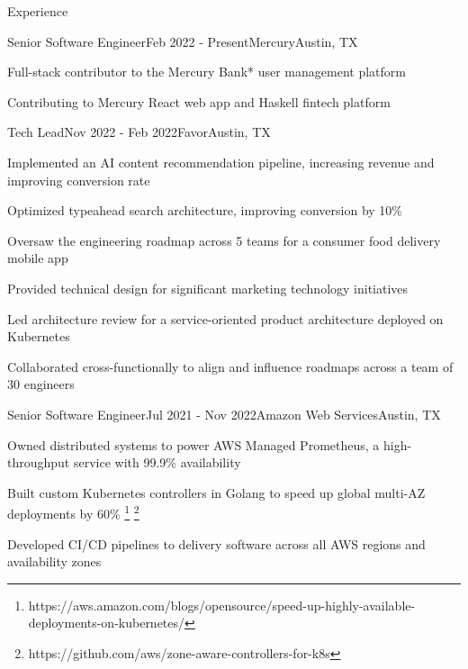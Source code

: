 \documentclass[
	10pt, %
]{resume} %
\begin{document}

\begin{rSection}{Experience}

    \begin{rSubsection}{Senior Software Engineer}{Feb 2022 - Present}{Mercury}{Austin, TX}
        \item Full-stack contributor to the Mercury Bank* user management platform
        \item Contributing to Mercury React web app and Haskell fintech platform
	\end{rSubsection}


	\begin{rSubsection}{Tech Lead}{Nov 2022 - Feb 2022}{Favor}{Austin, TX}
        \item Implemented an AI content recommendation pipeline, increasing revenue and improving conversion rate
        \item Optimized typeahead search architecture, improving conversion by 10\%
        \item Oversaw the engineering roadmap across 5 teams for a consumer food delivery mobile app
        \item Provided technical design for significant marketing technology initiatives
        \item Led architecture review for a service-oriented product architecture deployed on Kubernetes
        \item Collaborated cross-functionally to align and influence roadmaps across a team of 30 engineers
	\end{rSubsection}


    \begin{rSubsection}{Senior Software Engineer}{Jul 2021 - Nov 2022}{Amazon Web Services}{Austin, TX}
        \item Owned distributed systems to power AWS Managed Prometheus, a high-throughput service with 99.9\% availability
        \item Built custom Kubernetes controllers in Golang to speed up global multi-AZ deployments by 60\% \footnote{https://aws.amazon.com/blogs/opensource/speed-up-highly-available-deployments-on-kubernetes/} \footnote{https://github.com/aws/zone-aware-controllers-for-k8s}
        \item Developed CI/CD pipelines to delivery software across all AWS regions and availability zones
    \end{rSubsection}
    

\end{rSection}
\end{document}
